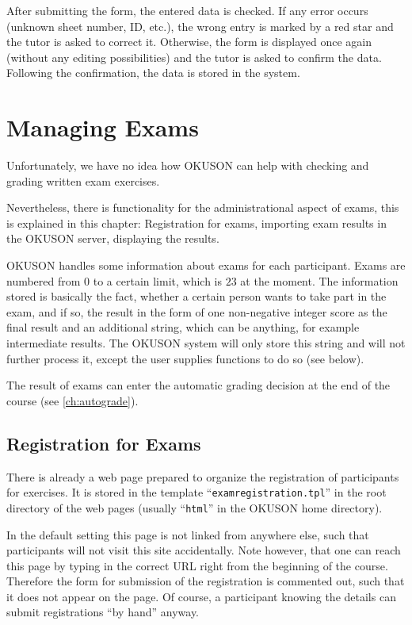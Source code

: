 \documentclass[12pt,openany,a4paper]{book}
\newcommand{\OKUSON}{\textsf{OKUSON}}
\begin{document}
After submitting the form, the entered data is checked. If any error
occurs (unknown sheet number, ID, etc.), the wrong entry is marked
by a red star and the tutor is asked to correct it. Otherwise, the form
is displayed once again (without any editing possibilities) and the
tutor is asked to confirm the data. Following the confirmation, the data
is stored in the system.


\chapter{Managing Exams}
\label{ch:ExamOrga}

Unfortunately, we have no idea how {\OKUSON} can help with checking and
grading written exam exercises.

Nevertheless, there is functionality for the administrational aspect of
exams, this is explained in this chapter: Registration for exams, 
importing exam results in the {\OKUSON} server, displaying the results.

{\OKUSON} handles some information about exams for each participant. 
Exams are numbered from $0$ to a certain limit, which is $23$ at the 
moment. The information stored is basically the fact, whether a certain 
person wants to take part in the exam, and if so, the result in the form
of one non-negative integer score as the final result and an additional
string, which can be anything, for example intermediate results. The
{\OKUSON} system will only store this string and will not further process
it, except the user supplies functions to do so (see below).

The result of exams can enter the automatic grading decision at the end
of the course (see \ref{ch:autograde}).


\section{Registration for Exams}

There is already a web page prepared to organize the registration of 
participants for exercises. It is stored in the template 
``\texttt{examregistration.tpl}'' in the root directory of the
web pages (usually ``\texttt{html}'' in the {\OKUSON} home directory).

In the default setting this page is not linked from anywhere else, such that
participants will not visit this site accidentally. Note however, that
one can reach this page by typing in the correct URL right from the beginning
of the course. Therefore the form for submission of the registration is
commented out, such that it does not appear on the page. Of course, a
participant knowing the details can submit registrations ``by hand'' anyway.
\end{document}
